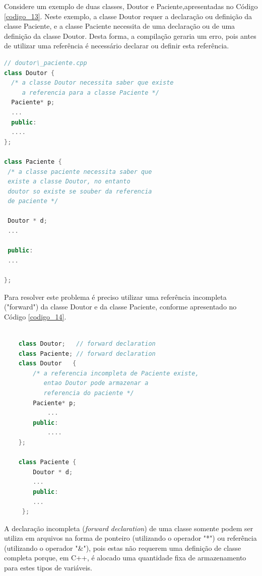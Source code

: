 Considere um exemplo de duas classes, Doutor e Paciente,apresentadas no 
Código \ref{codigo_13}. Neste exemplo, a classe Doutor requer a 
declaração ou definição da classe Paciente, e a classe Paciente necessita 
de uma declaração ou de uma definição da classe Doutor. Desta forma, a 
compilação geraria um erro, pois antes de utilizar uma referência é 
necessário declarar ou definir esta referência.

\begin{lstlisting}[language=C++,frame=single,title={Código 13: 
                   Arquivo com Declaração de Paciente e Doutor},
                                                label=codigo_13]
// doutor\_paciente.cpp
class Doutor {
  /* a classe Doutor necessita saber que existe 
     a referencia para a classe Paciente */
  Paciente* p; 
  ...          
  public:
  ....
};

class Paciente {
 /* a classe paciente necessita saber que 
 existe a classe Doutor, no entanto
 doutor so existe se souber da referencia
 de paciente */

 Doutor * d; 
 ...  

 public:
 ...  

};

\end{lstlisting}

Para resolver este problema é preciso utilizar uma 
referência incompleta ("forward") da classe Doutor e da
 classe Paciente, conforme apresentado no Código \ref{codigo_14}. 


\begin{lstlisting}[language=C++,frame=single,title={Código 14: 
                   Arquivo com Declaração de Paciente e Doutor},
                                                label=codigo_14]

    class Doutor;   // forward declaration
    class Paciente; // forward declaration
    class Doutor   {
        /* a referencia incompleta de Paciente existe,
           entao Doutor pode armazenar a 
           referencia do paciente */
        Paciente* p; 
            ... 
        public: 
            .... 
    };
    
    class Paciente {
        Doutor * d; 
        ... 
        public: 
        ...
     };

\end{lstlisting}




A declaração incompleta (\textit{forward declaration}) de uma classe somente podem
 ser utiliza em arquivos na forma de ponteiro (utilizando o operador "*")
 ou referência (utilizando o operador "\&"), pois estas não requerem uma
 definição de classe completa porque, em C++, é alocado uma quantidade fixa
 de armazenamento para estes tipos de variáveis\cite{ref43}.


